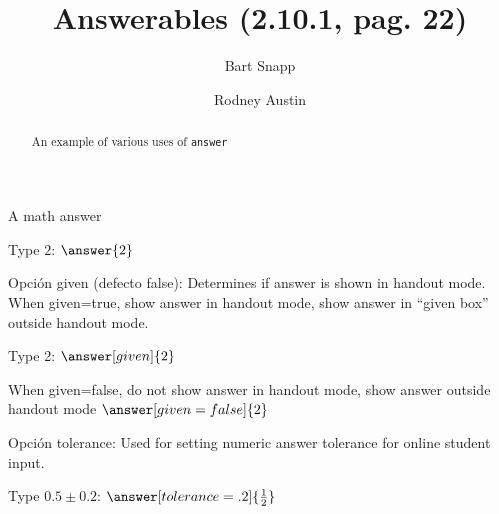\documentclass{ximera}
\title[Examples:]{Answerables (2.10.1, pag. 22)}
\author{Bart Snapp \and Rodney Austin}
\begin{document}
\begin{abstract}
  An example of various uses of \texttt{answer}
\end{abstract}
\maketitle

A math answer

Type $2$: $\answer{2}$

Opci{\'{o}}n  {\ttfamily given} (defecto false): Determines if answer is shown in handout mode. 
When given=true, show answer in handout mode, show answer in “given box” outside handout mode. 

Type 2: $\answer[given]{2}$

When given=false, do not show answer in handout mode, show answer outside handout mode  
$\answer[given=false]{2}$

Opci\'{o}n {\ttfamily tolerance}: Used for setting numeric answer tolerance for online student input.

Type $0.5\pm 0.2$: $\answer[tolerance=.2]{\frac{1}{2}}$
\end{document}
